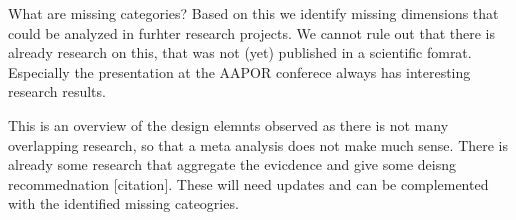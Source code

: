 What are missing categories?
Based on this we identify missing dimensions that could be analyzed in furhter research projects. We cannot rule out that there is already research on this, that was not (yet) published in a scientific fomrat. Especially the presentation at the AAPOR conferece always has interesting research results. 

This is an overview of the design elemnts observed as there is not many overlapping research, so that a meta analysis does not make much sense. There is already some research that aggregate the evicdence and give some deisng recommednation [citation]. These will need updates and can be complemented with the identified missing cateogries.